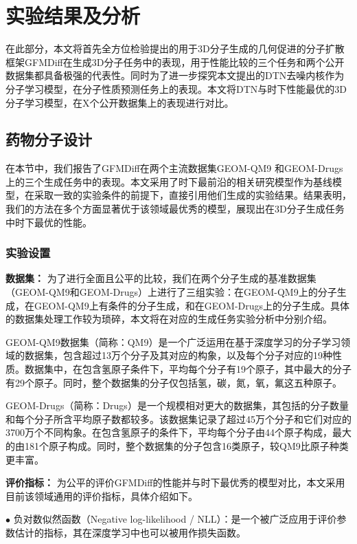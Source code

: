 \chapter{实验结果及分析}
\label{chap:experiment}

在此部分，本文将首先全方位检验提出的用于3D分子生成的几何促进的分子扩散框架GFMDiff在生成3D分子任务中的表现，用于性能比较的三个任务和两个公开数据集都具备极强的代表性。同时为了进一步探究本文提出的DTN去噪内核作为分子学习模型，在分子性质预测任务上的表现。本文将DTN与时下性能最优的3D分子学习模型，在X个公开数据集上的表现进行对比。

\section{药物分子设计}
在本节中，我们报告了GFMDiff在两个主流数据集GEOM-QM9 \cite{qm9_ramakrishnan_14}和GEOM-Drugs \cite{drugs_axelrod_22}上的三个生成任务中的表现。本文采用了时下最前沿的相关研究模型作为基线模型，在采取一致的实验条件的前提下，直接引用他们生成的实验结果。结果表明，我们的方法在多个方面显著优于该领域最优秀的模型，展现出在3D分子生成任务中时下最优的性能。

\subsection{实验设置}

\textbf{数据集：}
为了进行全面且公平的比较，我们在两个分子生成的基准数据集（GEOM-QM9和GEOM-Drugs）上进行了三组实验：在GEOM-QM9上的分子生成，在GEOM-QM9上有条件的分子生成，和在GEOM-Drugs上的分子生成。具体的数据集处理工作较为琐碎，本文将在对应的生成任务实验分析中分别介绍。

GEOM-QM9数据集（简称：QM9）是一个广泛运用在基于深度学习的分子学习领域的数据集，包含超过13万个分子及其对应的构象，以及每个分子对应的19种性质。数据集中，在包含氢原子条件下，平均每个分子有19个原子，其中最大的分子有29个原子。同时，整个数据集的分子仅包括氢，碳，氮，氧，氟这五种原子。

GEOM-Drugs（简称：Drugs）是一个规模相对更大的数据集，其包括的分子数量和每个分子所含平均原子数都较多。该数据集记录了超过45万个分子和它们对应的3700万个不同构象。在包含氢原子的条件下，平均每个分子由44个原子构成，最大的由181个原子构成。同时，整个数据集的分子包含16类原子，较QM9比原子种类更丰富。

\textbf{评价指标：}
为公平的评价GFMDiff的性能并与时下最优秀的模型对比，本文采用目前该领域通用的评价指标，具体介绍如下。

$\bullet$ 负对数似然函数（Negative log-likelihood / NLL）：是一个被广泛应用于评价参数估计的指标，其在深度学习中也可以被用作损失函数。

